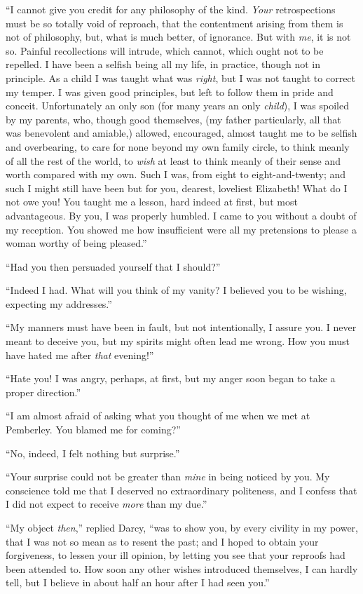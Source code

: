 ``I cannot give you credit for any philosophy of the kind. \textit{Your} retrospections must be so totally void of reproach, that the contentment arising from them is not of philosophy, but, what is much better, of ignorance. But with \textit{me}, it is not so. Painful recollections will intrude, which cannot, which ought not to be repelled. I have been a selfish being all my life, in practice, though not in principle. As a child I was taught what was \textit{right}, but I was not taught to correct my temper. I was given good principles, but left to follow them in pride and conceit. Unfortunately an only son (for many years an only \textit{child}), I was spoiled by my parents, who, though good themselves, (my father particularly, all that was benevolent and amiable,) allowed, encouraged, almost taught me to be selfish and overbearing, to care for none beyond my own family circle, to think meanly of all the rest of the world, to \textit{wish} at least to think meanly of their sense and worth compared with my own. Such I was, from eight to eight-and-twenty; and such I might still have been but for you, dearest, loveliest Elizabeth! What do I not owe you! You taught me a lesson, hard indeed at first, but most advantageous. By you, I was properly humbled. I came to you without a doubt of my reception. You showed me how insufficient were all my pretensions to please a woman worthy of being pleased.''

``Had you then persuaded yourself that I should?''

``Indeed I had. What will you think of my vanity? I believed you to be wishing, expecting my addresses.''

``My manners must have been in fault, but not intentionally, I assure you. I never meant to deceive you, but my spirits might often lead me wrong. How you must have hated me after \textit{that} evening!''

``Hate you! I was angry, perhaps, at first, but my anger soon began to take a proper direction.''

``I am almost afraid of asking what you thought of me when we met at Pemberley. You blamed me for coming?''

``No, indeed, I felt nothing but surprise.''

``Your surprise could not be greater than \textit{mine} in being noticed by you. My conscience told me that I deserved no extraordinary politeness, and I confess that I did not expect to receive \textit{more} than my due.''

``My object \textit{then},'' replied Darcy, ``was to show you, by every civility in my power, that I was not so mean as to resent the past; and I hoped to obtain your forgiveness, to lessen your ill opinion, by letting you see that your reproofs had been attended to. How soon any other wishes introduced themselves, I can hardly tell, but I believe in about half an hour after I had seen you.''

